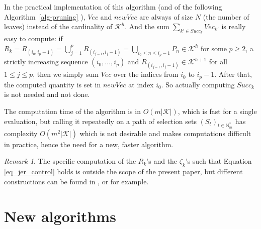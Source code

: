 \documentclass[
  11pt,
  a4paper,
]{article}
\theoremstyle{plain}
\theoremstyle{plain}
\theoremstyle{plain}
\theoremstyle{definition}
\theoremstyle{definition}
\theoremstyle{remark}
\newtheorem{refremark}{Remark}[section]
\begin{document}
\begin{tcolorbox}[enhanced jigsaw, left=2mm, bottomtitle=1mm, toprule=.15mm, opacitybacktitle=0.6, colframe=quarto-callout-tip-color-frame, breakable, arc=.35mm, titlerule=0mm, colback=white, toptitle=1mm, leftrule=.75mm, opacityback=0, rightrule=.15mm, bottomrule=.15mm, title=\textcolor{quarto-callout-tip-color}{\faLightbulb}\hspace{0.5em}{Tip}, coltitle=black, colbacktitle=quarto-callout-tip-color!10!white]

In the practical implementation of this algorithm (and of the following
 Algorithm~\ref{alg-pruning} ), \(Vec\) and \(newVec\) are always of
size \(N\) (the number of leaves) instead of the cardinality of
\(\mathcal{K}^h\). And the sum \(\sum_{k'\in Succ_k} Vec_{k'}\) is
really easy to compute: if
\(R_k= R_{(i_0,i_{p}-1)}= \bigcup_{ j=1}^{p} R_{(i_{ j-1}, i_{ j}-1)}=\bigcup_{i_0\leq n\leq i_{p}-1}P_n\in\mathcal{K}^h\)
for some \(p\geq2\), a strictly increasing sequence
\((i_0,\dotsc,i_{p})\) and
\(R_{(i_{ j-1}, i_{ j}-1)}\in\mathcal{K}^{h+1}\) for all
\(1\leq j\leq p\), then we simply sum \(Vec\) over the indices from
\(i_{0}\) to \(i_{p}-1\). After that, the computed quantity is set in
\(newVec\) at index \(i_0\). So actually computing \(Succ_k\) is not
needed and not done.

\end{tcolorbox}

The computation time of the algorithm is in \(O(m|\mathcal{K}|)\), which
is fast for a single evaluation, but calling it repeatedly on a path of
selection sets \((S_t)_{t\in\mathbb{N}_m^*}\) has complexity
\(O(m^2|\mathcal{K}|)\) which is not desirable and makes computations
difficult in practice, hence the need for a new, faster algorithm.

\begin{refremark}
The specific computation of the \(R_k\)'s and the \(\zeta_k\)'s such
that Equation \eqref{eq_jer_control} holds is outside the scope of the
present paper, but different constructions can be found in
\citet{MR4124323}, \citet{MR4178188} or \citet{blain22notip} for
example.

\label{rem-zeta}

\end{refremark}

\section{New algorithms}\label{new-algorithms}
\end{document}
